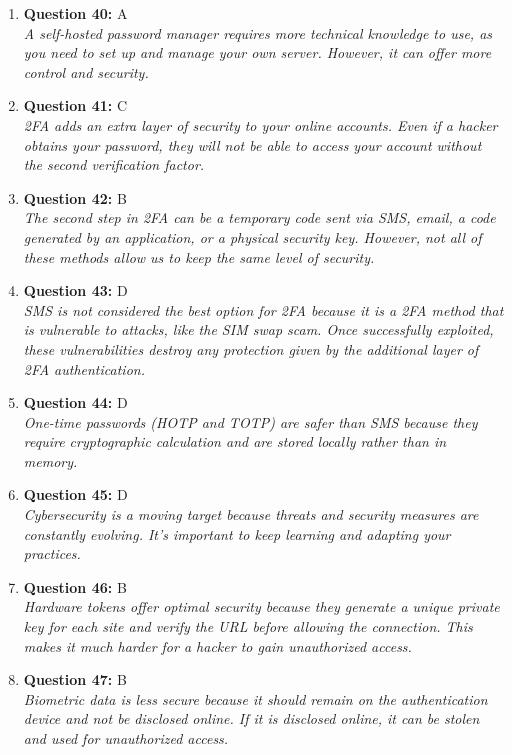 \documentclass[12pt,a4paper]{article}
\begin{document}
\begin{enumerate}
\item \textbf{Question 40:} A
\\ \textit{A self-hosted password manager requires more technical
knowledge to use, as you need to set up and manage your own
server. However, it can offer more control and security.}

\item \textbf{Question 41:} C
\\ \textit{2FA adds an extra layer of security to your online
accounts. Even if a hacker obtains your password, they will
not be able to access your account without the second
verification factor.}

\item \textbf{Question 42:} B
\\ \textit{The second step in 2FA can be a temporary code sent via SMS, email, a code generated by an application, or a physical security key. However, not all of these methods allow us to keep the same level of security.}

\item \textbf{Question 43:} D
\\ \textit{SMS is not considered the best option for 2FA because it is a 2FA method that is vulnerable to attacks, like the SIM swap scam. Once successfully exploited, these vulnerabilities destroy any protection given by the additional layer of 2FA authentication.}

\item \textbf{Question 44:} D
\\ \textit{One-time passwords (HOTP and TOTP) are safer than SMS
because they require cryptographic calculation and are
stored locally rather than in memory.}

\item \textbf{Question 45:} D
\\ \textit{Cybersecurity is a moving target because threats and
security measures are constantly evolving. It's important
to keep learning and adapting your practices.}

\item \textbf{Question 46:} B
\\ \textit{Hardware tokens offer optimal security because they
generate a unique private key for each site and verify the
URL before allowing the connection. This makes it much
harder for a hacker to gain unauthorized access.}

\item \textbf{Question 47:} B
\\ \textit{Biometric data is less secure because it should remain on
the authentication device and not be disclosed online. If
it is disclosed online, it can be stolen and used for
unauthorized access.}


\end{enumerate}
\end{document}
